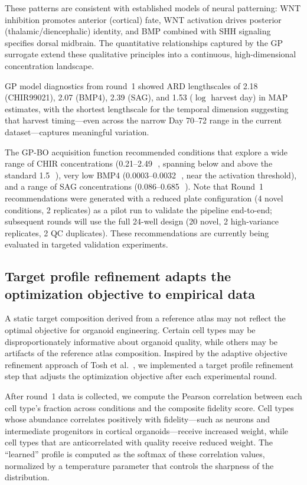 \documentclass[times,twoside]{zHenriquesLab-StyleBioRxiv}
\begin{document}
These patterns are consistent with established models of neural patterning: WNT inhibition promotes anterior (cortical) fate, WNT activation drives posterior (thalamic/diencephalic) identity, and BMP combined with SHH signaling specifies dorsal midbrain. The quantitative relationships captured by the GP surrogate extend these qualitative principles into a continuous, high-dimensional concentration landscape.

GP model diagnostics from round~1 showed ARD lengthscales of 2.18 (CHIR99021), 2.07 (BMP4), 2.39 (SAG), and 1.53 ($\log$ harvest day) in MAP estimates, with the shortest lengthscale for the temporal dimension suggesting that harvest timing---even across the narrow Day 70--72 range in the current dataset---captures meaningful variation.

The GP-BO acquisition function recommended conditions that explore a wide range of CHIR concentrations (0.21--2.49\,\si{\micro\Molar}, spanning below and above the standard 1.5\,\si{\micro\Molar}), very low BMP4 (0.0003--0.0032\,\si{\micro\Molar}, near the activation threshold), and a range of SAG concentrations (0.086--0.685\,\si{\micro\Molar}). Note that Round~1 recommendations were generated with a reduced plate configuration (4 novel conditions, 2 replicates) as a pilot run to validate the pipeline end-to-end; subsequent rounds will use the full 24-well design (20 novel, 2 high-variance replicates, 2 QC duplicates). These recommendations are currently being evaluated in targeted validation experiments.

\subsection*{Target profile refinement adapts the optimization objective to empirical data}

A static target composition derived from a reference atlas may not reflect the optimal objective for organoid engineering. Certain cell types may be disproportionately informative about organoid quality, while others may be artifacts of the reference atlas composition. Inspired by the adaptive objective refinement approach of Tosh et al.\ \cite{Tosh2025batchie}, we implemented a target profile refinement step that adjusts the optimization objective after each experimental round.

After round~1 data is collected, we compute the Pearson correlation between each cell type's fraction across conditions and the composite fidelity score. Cell types whose abundance correlates positively with fidelity---such as neurons and intermediate progenitors in cortical organoids---receive increased weight, while cell types that are anticorrelated with quality receive reduced weight. The ``learned'' profile is computed as the softmax of these correlation values, normalized by a temperature parameter that controls the sharpness of the distribution.
\end{document}
